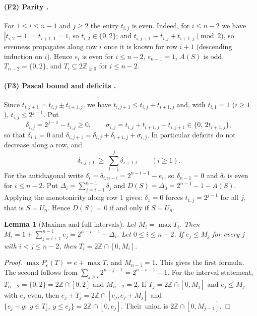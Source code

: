 \documentclass[11pt,a4paper]{article}
\newtheorem{lemma}[theorem]{Lemma}
\theoremstyle{definition}
\theoremstyle{remark}
\numberwithin{equation}{section}
\begin{document}
\paragraph{(F2) Parity \cite{R021}.}
For $1\le i\le n-1$ and $j\ge2$ the entry $t_{i,j}$ is even. Indeed, for $i\le n-2$ we have
$|t_{i,2}-1|=t_{i+1,1}=1$, so $t_{i,2}\in\{0,2\}$; and $t_{i,j+1}\equiv t_{i,j}+t_{i+1,j}\pmod 2$,
so evenness propagates along row $i$ once it is known for row $i+1$ (descending induction on
$i$). Hence $e_i$ is even for
$i\le n-2$, $e_{n-1}=1$, $A(S)$ is odd, $T_{n-2}=\{0,2\}$, and $T_i\subseteq2\mathbb{Z}_{\ge0}$ for
$i\le n-2$.

\paragraph{(F3) Pascal bound and deficits \cite{R021}.}
Since $t_{i,j+1}=t_{i,j}\pm t_{i+1,j}$, we have $t_{i,j+1}\le t_{i,j}+t_{i+1,j}$ and, with
$t_{i,1}=1$ ($i\ge1$), $t_{i,j}\le2^{j-1}$. Put
\[
 \delta_{i,j}=2^{j-1}-t_{i,j}\ge0,\qquad
 \sigma_{i,j}=t_{i,j}+t_{i+1,j}-t_{i,j+1}\in\{0,\,2t_{i+1,j}\},
\]
so that $\delta_{i,1}=0$ and $\delta_{i,j+1}=\delta_{i,j}+\delta_{i+1,j}+\sigma_{i,j}$. In
particular deficits do not decrease along a row, and
\begin{equation}\label{B:G:eq:rowsum}
 \delta_{i,j+1}\ \ge\ \sum_{l=1}^{j}\delta_{i+1,l}\qquad(i\ge1).
\end{equation}
For the antidiagonal write $\delta_i=\delta_{i,n-i}=2^{n-i-1}-e_i$, so $\delta_{n-1}=0$ and
$\delta_i$ is even for $i\le n-2$. Put $\Delta_i=\sum_{j=i+1}^{n-1}\delta_j$ and
$D(S)=\Delta_0=2^{n-1}-1-A(S)$.
Applying the monotonicity along row $1$ gives: $\delta_1=0$ forces $t_{1,j}=2^{j-1}$ for
all $j$, that is $S=U_n$. Hence $D(S)=0$ if and only if $S=U_n$.

\begin{lemma}[Maxima and full intervals]\label{B:G:lem:interval}
Let $M_i=\max T_i$. Then $M_i=1+\sum_{j=i+1}^{n-1}e_j=2^{n-i-1}-\Delta_i$. Let
$0\le i\le n-2$. If $e_j\le M_j$ for every $j$ with $i<j\le n-2$, then
$T_i=2\mathbb{Z}\cap[0,M_i]$.
\end{lemma}

\begin{proof}
$\max P_e(T)=e+\max T$, and $M_{n-1}=1$. This gives the first formula. The second follows from
$\sum_{j>i}2^{n-j-1}=2^{n-i-1}-1$. For the interval statement, $T_{n-2}=\{0,2\}=2\mathbb{Z}\cap[0,2]$
and $M_{n-2}=2$. If $T_j=2\mathbb{Z}\cap[0,M_j]$ and $e_j\le M_j$ with $e_j$ even, then
$e_j+T_j=2\mathbb{Z}\cap[e_j,e_j+M_j]$ and $\{e_j-y:\ y\in T_j,\ y\le e_j\}=2\mathbb{Z}\cap[0,e_j]$.
Their union is $2\mathbb{Z}\cap[0,M_{j-1}]$.
\end{proof}
\end{document}
